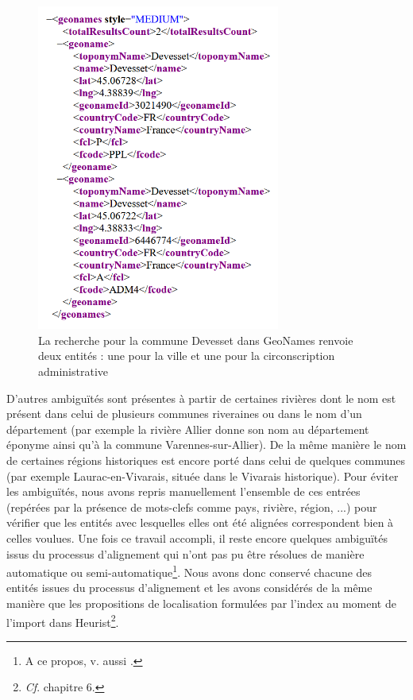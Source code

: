 \documentclass[a4paper,12pt,twoside]{book}
\begin{document}
	\begin{figure}
		\centering
		\includegraphics[width=8cm]{Images/town_on_geonames.png}
		\caption{La recherche pour la commune \og Devesset\fg{} dans GeoNames renvoie deux entités : une pour la ville et une pour la circonscription administrative}
		\label{Double_retour_GeoNames}
	\end{figure}
	
	 D'autres ambiguïtés sont présentes à partir de certaines rivières dont le nom est présent dans celui de plusieurs communes riveraines ou dans le nom d'un département (par exemple la rivière Allier donne son nom au département éponyme ainsi qu'à la commune Varennes-sur-Allier). De la même manière le nom de certaines régions historiques est encore porté dans celui de quelques communes (par exemple Laurac-en-Vivarais, située dans le Vivarais historique). Pour éviter les ambiguïtés, nous avons repris manuellement l'ensemble de ces entrées (repérées par la présence de mots-clefs comme \og pays\fg{}, \og rivière\fg{}, \og région\fg{}, ...) pour vérifier que les entités avec lesquelles elles ont été alignées correspondent bien à celles voulues. Une fois ce travail accompli, il reste encore quelques ambiguïtés issus du processus d'alignement qui n'ont pas pu être résolues de manière automatique ou semi-automatique\footnote{A ce propos, v. aussi \cite{reignier_lindex_2022}.}. Nous avons donc conservé chacune des entités issues du processus d'alignement et les avons considérés de la même manière que les propositions de localisation formulées par l'index au moment de l'import dans Heurist\footnote{\textit{Cf}. chapitre 6.}.
	
\end{document}
